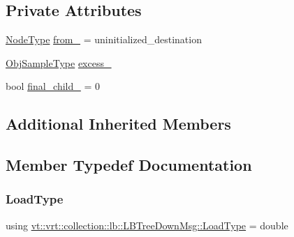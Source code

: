 \subsection*{Private Attributes}
\begin{DoxyCompactItemize}
\item 
\hyperlink{namespacevt_a866da9d0efc19c0a1ce79e9e492f47e2}{Node\+Type} \hyperlink{structvt_1_1vrt_1_1collection_1_1lb_1_1_l_b_tree_down_msg_a1f4c856f63f14073bf5713e1be6ae30e}{from\+\_\+} = uninitialized\+\_\+destination
\item 
\hyperlink{structvt_1_1vrt_1_1collection_1_1lb_1_1_hier_l_b_types_a597a60d517207b90e8c7984eac434e8f}{Obj\+Sample\+Type} \hyperlink{structvt_1_1vrt_1_1collection_1_1lb_1_1_l_b_tree_down_msg_a9e31b51089a40dc10dde88967a91af09}{excess\+\_\+}
\item 
bool \hyperlink{structvt_1_1vrt_1_1collection_1_1lb_1_1_l_b_tree_down_msg_abb94529b3dcc3611eaf2d242d8da2cdd}{final\+\_\+child\+\_\+} = 0
\end{DoxyCompactItemize}
\subsection*{Additional Inherited Members}


\subsection{Member Typedef Documentation}
\mbox{\label{structvt_1_1vrt_1_1collection_1_1lb_1_1_l_b_tree_down_msg_a7027506c735fa124564be187c5e6fb5d}} 
\subsubsection{\texorpdfstring{Load\+Type}{LoadType}}
{\footnotesize\ttfamily using \hyperlink{structvt_1_1vrt_1_1collection_1_1lb_1_1_l_b_tree_down_msg_a7027506c735fa124564be187c5e6fb5d}{vt\+::vrt\+::collection\+::lb\+::\+L\+B\+Tree\+Down\+Msg\+::\+Load\+Type} =  double}

\mbox{\label{structvt_1_1vrt_1_1collection_1_1lb_1_1_l_b_tree_down_msg_a519ac9259e7e931d2ec529c73917cc56}} 
